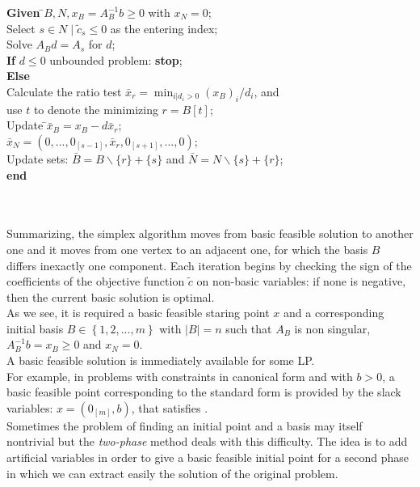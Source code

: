 \documentclass[a4paper,10 pt,titlepage,twoside]{book}
\theoremstyle{plain}
\theoremstyle{definition}
\theoremstyle{remark}
\begin{document}
\begin{tabbing}
	\textbf{Given} \=$B, N, x_{B} = A_{B}^{-1}b\geq 0$ with $x_{N}=0$;\\
	\> Select $s\in N\;|\;\widetilde{c}_{s}\leq 0$ as the entering index;\\
	\> Solve $A_{B}d = A_{s}$ for $d$;\\
	\>\textbf{If} {$d \leq 0$} unbounded problem: \textbf{stop};\\
	\>\textbf{Else} \=\\
	\>\>Calculate the ratio test $\bar{x}_{r} = \min_{i | d_{i} > 0}(x_{B})_{i}/d_{i}$, and\\
	\>\>use $t$ to denote the minimizing $r = B[t]$;\\
	\>\>Update \=$\bar{x}_{B} = x_{B}-d\bar{x}_{r}$;\\
	\>\>\>$\bar{x}_{N} = (0,...,0_{[s-1]},\bar{x}_{r},0_{[s+1]},...,0)$;\\
	\>\> Update sets: $\bar{B} = B \backslash \{r\} + \{s\}$ and $\bar{N} = N \backslash \{s\} + \{r\}$;\\
	\textbf{end}
\end{tabbing}
\\
\\
Summarizing, the simplex algorithm moves from basic feasible solution to another one and it moves from one vertex to an adjacent one, for which the basis $B$ differs inexactly one component. Each iteration begins by checking the sign of the coefficients of the objective function $\widetilde{c}$ on non-basic variables: if none is negative, then the current basic solution is optimal. \\
As we see, it is required a basic feasible staring point $x$ and a corresponding initial basis $B \in \left\{ 1,2,..., m \right\}$ with $|B|=n$ such that $A_{B}$ is non singular, $A_{B}^{-1}b=x_{B} \geq 0$ and $x_{N}=0$.\\
A basic feasible solution is immediately available for some LP.\\ For example, in problems with constraints in canonical form and with $b > 0$, a basic feasible point corresponding to the standard form is provided by the slack variables: $x =\left(0_{[m]},b\right)$, that satisfies .\\Sometimes the problem of finding an initial point and a basis may itself nontrivial but the \textit{two-phase} method deals with this difficulty. The idea is to add artificial variables in order to give a basic feasible initial point for a second phase in which we can extract easily the solution of the original problem.\\
\end{document}
